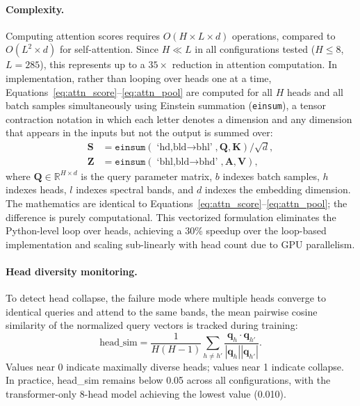 \documentclass[11pt]{report}
\newcommand{\R}{\mathbb{R}}
\begin{document}
\paragraph{Complexity.}
Computing attention scores requires $O(H \times L \times d)$ operations, compared to $O(L^2 \times d)$ for self-attention. 
Since $H \ll L$ in all configurations tested ($H \leq 8$, $L = 285$), this represents up to a $35\times$ reduction in attention computation. 
In implementation, rather than looping over heads one at a time, Equations~\ref{eq:attn_score}--\ref{eq:attn_pool} are computed for all $H$ heads and all batch samples simultaneously using Einstein summation (\texttt{einsum}), a tensor contraction notation in which each letter denotes a dimension and any dimension that appears in the inputs but not the output is summed over:
\begin{align}
\mathbf{S} &= \texttt{einsum}(\text{`hd,bld$\to$bhl'}, \mathbf{Q}, \mathbf{K}) / \sqrt{d}, \label{eq:einsum_scores} \\
\mathbf{Z} &= \texttt{einsum}(\text{`bhl,bld$\to$bhd'}, \mathbf{A}, \mathbf{V}), \label{eq:einsum_pool}
\end{align}
where $\mathbf{Q} \in \R^{H \times d}$ is the query parameter matrix, $b$ indexes batch samples, $h$ indexes heads, $l$ indexes spectral bands, and $d$ indexes the embedding dimension. The mathematics are identical to Equations~\ref{eq:attn_score}--\ref{eq:attn_pool}; the difference is purely computational. This vectorized formulation eliminates the Python-level loop over heads, achieving a 30\% speedup over the loop-based implementation and scaling sub-linearly with head count due to GPU parallelism.

\paragraph{Head diversity monitoring.}
To detect head collapse, the failure mode where multiple heads converge to identical queries and attend to the same bands, the mean pairwise cosine similarity of the normalized query vectors is tracked during training:
\begin{equation}
\text{head\_sim} = \frac{1}{H(H-1)} \sum_{h \neq h'} \frac{\mathbf{q}_h \cdot \mathbf{q}_{h'}}{|\mathbf{q}_h||\mathbf{q}_{h'}|}.
\label{eq:head_sim}
\end{equation}
Values near 0 indicate maximally diverse heads; 
values near 1 indicate collapse. 
In practice, head\_sim remains below 0.05 across all configurations, with the transformer-only 8-head model achieving the lowest value (0.010).
\end{document}
